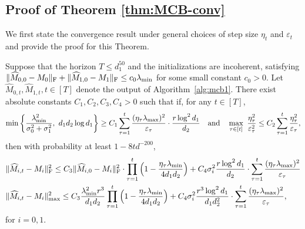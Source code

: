 \documentclass[12pt]{article}
\def\hat{\widehat}
\def\eps{\varepsilon}
\theoremstyle{plain}
\begin{document}
\subsection{Proof of Theorem \ref{thm:MCB-conv}} \label{proof:completeconv}
We first state the convergence result under general choices of step size $\eta_t$ and $\varepsilon_t$ and provide the proof for this Theorem. 
\begin{thm} \label{thm:genera-thm1}
Suppose that the horizon $T\leq d_1^{50}$ and the initializations are incoherent,  satisfying $\|\hat M_{0,0}-M_0\|_{\rm F}+\|\hat M_{1,0}-M_1\|_{\rm F}\leq c_0\lambda_{\min}$ for some small constant $c_0>0$. Let $\hat M_{0,t}, \hat M_{1,t}, t\in[T]$ denote the output of Algorithm~\ref{alg:mcb1}. 
There exist absolute constants $C_1, C_2,C_3, C_4>0$ such that if, for any $t\in[T]$, 
\begin{align}\label{eq:thm-MCB-eq1}
\min\bigg\{\frac{\lambda_{\min}^2}{\sigma_0^2+\sigma_1^2},\ d_1d_2\log d_1\bigg\}\geq C_1 \sum_{\tau=1}^t \frac{(\eta_{\tau}\lambda_{\max})^2}{\eps_{\tau}}\cdot \frac{r\log^2d_1}{d_2}\quad {\rm and}\quad \max_{\tau\in [t]}\ \frac{\eta_{\tau}^2}{\eps_{\tau}^2}\leq C_2\sum_{\tau=1}^t\frac{\eta_{\tau}^2}{\eps_{\tau}},
\end{align}
then with probability at least $1-8td^{-200}$,
\begin{align*}
&\|\hat M_{i,t}-M_i\|_{\rm F}^2\leq C_3\|\hat M_{i,0}-M_i\|_{\rm F}^2\cdot \prod_{\tau=1}^t \Big(1-\frac{\eta_{\tau}\lambda_{\min}}{4d_1d_2}\Big) +C_4\sigma_i^2\frac{r\log^2 d_1}{d_2}\cdot  \sum_{\tau=1}^t \frac{(\eta_{\tau}\lambda_{\max})^2}{\eps_{\tau}}\\
&\|\hat M_{i, t}-M_i\|_{\max}^2\leq C_3\frac{\lambda_{\min}^2r^3}{d_1d_2}\prod_{\tau=1}^t\Big(1-\frac{\eta_{\tau}\lambda_{\min}}{4d_1d_2}\Big) +C_4\sigma_i^2\frac{r^3\log^2d_1}{d_1d_2^2}\cdot  \sum_{\tau=1}^t \frac{(\eta_{\tau}\lambda_{\max})^2}{\eps_{\tau}},
\end{align*}
for $i=0, 1$. 
\end{thm}
\end{document}
